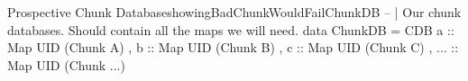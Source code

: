 \begin{pseudohaskell}{Prospective Chunk Database}{showingBadChunkWouldFailChunkDB}
-- | Our chunk databases. Should contain all the maps we will need.
data ChunkDB = CDB { a   :: Map UID (Chunk A)
                   , b   :: Map UID (Chunk B)
                   , c   :: Map UID (Chunk C)
                   , ... :: Map UID (Chunk ...)
                   }
\end{pseudohaskell}
